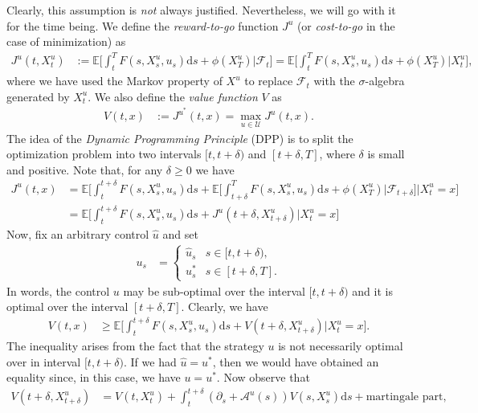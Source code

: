\documentclass[12pt]{book}
\let\varphi\phi
\numberwithin{equation}{chapter}
\theoremstyle{plain}
\numberwithin{theorem}{section}
\theoremstyle{definition}
\numberwithin{exercise}{chapter}
\newcommand{\<}{\langle}
\renewcommand{\>}{\rangle}
\renewcommand{\(}{\left(}
\renewcommand{\)}{\right)}
\renewcommand{\[}{\left[}
\renewcommand{\]}{\right]}
\newcommand\Eb{\mathds{E}}
\newcommand\Ac{\mathscr{A}}
\newcommand\Fc{\mathscr{F}}
\newcommand\Uc{\mathscr{U}}
\newcommand\sig{\sigma}
\newcommand\del{\delta}
\newcommand\uh{\widehat{u}}
\renewcommand\d{\partial}
\newcommand\dd{\mathrm{d}}
\begin{document}
\noindent
Clearly, this assumption is \emph{not} always justified.  Nevertheless, we will go with it for the time being.  
We define the \emph{reward-to-go} function $J^u$ (or \emph{cost-to-go} in the case of minimization) as
\begin{align}
J^u(t,X_t^u)
	&:=	\Eb \Big[ \int_t^T F(s,X_s^u,u_s) \dd s + \varphi(X_T^u) \Big| \Fc_t \Big] 
	=		\Eb \Big[ \int_t^T F(s,X_s^u,u_s) \dd s + \varphi(X_T^u) \Big| X_t^u \Big] ,
\end{align}
where we have used the Markov property of $X^u$ to replace $\Fc_t$ with the $\sig$-algebra generated by $X_t^u$.  
We also define the \emph{value function} $V$ as
\begin{align}
V(t,x)
	&:=	J^{u^*}(t,x) = \max_{u \in \Uc} J^u(t,x) . \label{eq:Value-Function}
\end{align}
The idea of the \emph{Dynamic Programming Principle} (DPP) is to split the optimization problem into two intervals $[t,t+\del)$ and $[t+\del,T]$, where $\del$ is small and positive.  Note that, for any $\del \geq 0$ we have
\begin{align}
J^u(t,x)
	&=	\Eb \Big[ \int_t^{t + \del} F(s,X_s^u,u_s) \dd s 
			+ \Eb \Big[ \int_{t + \del}^T F(s,X_s^u,u_s) \dd s + \varphi(X_T^u) \Big| \Fc_{t+\del} \Big] 
			\Big| X_t^u = x \Big] \\
	&=	\Eb \Big[ \int_t^{t + \del} F(s,X_s^u,u_s) \dd s 
			+ J^u(t+\del,X_{t+\del}^u) 
			\Big| X_t^u = x \Big] 
\end{align}
Now, fix an arbitrary control $\uh$ and set
\begin{align}
u_s
	&=	\left\{ \begin{array}{ll}
			\uh_s 	& s \in [t,t+\del) , \\
			u_s^* & s \in [t+\del, T] .
			\end{array} \right.
\end{align}
In words, the control $u$ may be sub-optimal over the interval $[t,t+\del)$ and it is optimal over the interval $[t+\del,T]$.  Clearly, we have
\begin{align}
V(t,x)
	&\geq	\Eb \Big[ \int_t^{t + \del} F(s,X_s^u,u_s) \dd s 
			+ V(t+\del,X_{t+\del}^u) 
			\Big| X_t^u = x \Big] . \label{eq:V.1}
\end{align}
The inequality arises from the fact that the strategy $u$ is not necessarily optimal over in interval $[t,t+\del)$.  If we had $\uh = u^*$, then we would have obtained an equality since, in this case, we have $u = u^*$.  Now observe that
\begin{align}
V(t+\del,X_{t+\del}^u)
	&=	V(t,X_t^u) + \int_t^{t+\del} ( \d_s + \Ac^u(s) ) V(s,X_s^u) \dd s + \text{martingale part} , 
\end{align}
\end{document}
